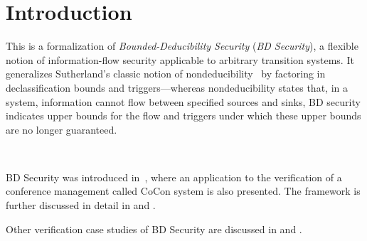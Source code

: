 
\section{Introduction}

This is a formalization of {\em Bounded-Deducibility Security} ({\em BD Security}),
a flexible notion of information-flow security applicable to arbitrary transition systems.
It generalizes Sutherland's classic notion of
nondeducibility~\cite{sutherland-modelOfInf} by factoring in declassification bounds and triggers---whereas nondeducibility
states that, in a system, information cannot flow between specified sources and sinks,
BD security indicates upper bounds for the flow and triggers under which these upper bounds
are no longer guaranteed.

\par \ \par
BD Security was introduced in~\cite{cocon-CAV2014}, where an application to the verification of a conference management called CoCon
system is also presented.
%
The framework is further discussed in detail in \cite{cocon-JAR2021}
and \cite{BDsecurity-ITP2021}.

Other verification case studies of BD Security are discussed
in \cite{cosmed-itp2016,cosmed-jar2018} and \cite{cosmedis-SandP2017}.

